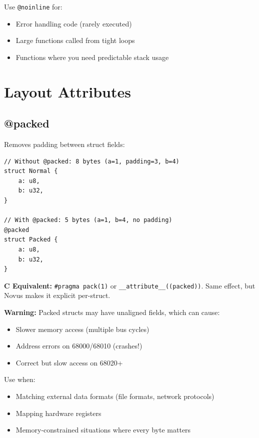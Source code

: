 Use \texttt{@noinline} for:
\begin{itemize}
    \item Error handling code (rarely executed)
    \item Large functions called from tight loops
    \item Functions where you need predictable stack usage
\end{itemize}

\section{Layout Attributes}
\label{sec:layout-attributes}

\subsection{@packed}

Removes padding between struct fields:

\begin{lstlisting}
// Without @packed: 8 bytes (a=1, padding=3, b=4)
struct Normal {
    a: u8,
    b: u32,
}

// With @packed: 5 bytes (a=1, b=4, no padding)
@packed
struct Packed {
    a: u8,
    b: u32,
}
\end{lstlisting}

\begin{comingfromc}
\textbf{C Equivalent:} \texttt{\#pragma pack(1)} or \texttt{\_\_attribute\_\_((packed))}. Same effect, but Novus makes it explicit per-struct.
\end{comingfromc}

\textbf{Warning:} Packed structs may have unaligned fields, which can cause:
\begin{itemize}
    \item Slower memory access (multiple bus cycles)
    \item Address errors on 68000/68010 (crashes!)
    \item Correct but slow access on 68020+
\end{itemize}

Use when:
\begin{itemize}
    \item Matching external data formats (file formats, network protocols)
    \item Mapping hardware registers
    \item Memory-constrained situations where every byte matters
\end{itemize}

